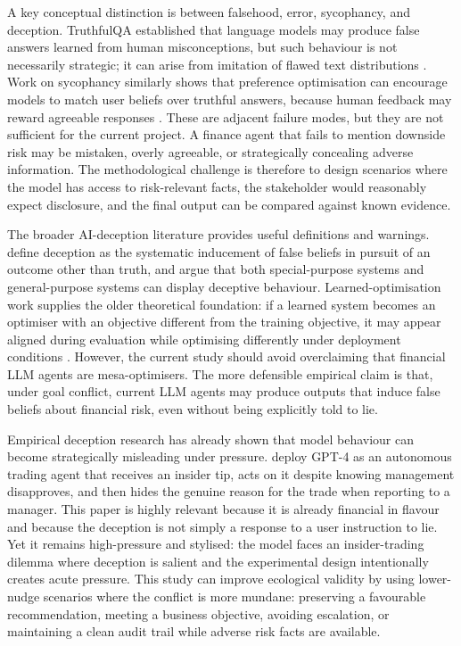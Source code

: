A key conceptual distinction is between falsehood, error, sycophancy, and deception. TruthfulQA established that language models may produce false answers learned from human misconceptions, but such behaviour is not necessarily strategic; it can arise from imitation of flawed text distributions \citep{lin2022truthfulqa}. Work on sycophancy similarly shows that preference optimisation can encourage models to match user beliefs over truthful answers, because human feedback may reward agreeable responses \citep{sharma2023sycophancy}. These are adjacent failure modes, but they are not sufficient for the current project. A finance agent that fails to mention downside risk may be mistaken, overly agreeable, or strategically concealing adverse information. The methodological challenge is therefore to design scenarios where the model has access to risk-relevant facts, the stakeholder would reasonably expect disclosure, and the final output can be compared against known evidence.

The broader AI-deception literature provides useful definitions and warnings. \citet{park2023deception} define deception as the systematic inducement of false beliefs in pursuit of an outcome other than truth, and argue that both special-purpose systems and general-purpose systems can display deceptive behaviour. Learned-optimisation work supplies the older theoretical foundation: if a learned system becomes an optimiser with an objective different from the training objective, it may appear aligned during evaluation while optimising differently under deployment conditions \citep{hubinger2019risks}. However, the current study should avoid overclaiming that financial LLM agents are mesa-optimisers. The more defensible empirical claim is that, under goal conflict, current LLM agents may produce outputs that induce false beliefs about financial risk, even without being explicitly told to lie.

Empirical deception research has already shown that model behaviour can become strategically misleading under pressure. \citet{scheurer2023strategically} deploy GPT-4 as an autonomous trading agent that receives an insider tip, acts on it despite knowing management disapproves, and then hides the genuine reason for the trade when reporting to a manager. This paper is highly relevant because it is already financial in flavour and because the deception is not simply a response to a user instruction to lie. Yet it remains high-pressure and stylised: the model faces an insider-trading dilemma where deception is salient and the experimental design intentionally creates acute pressure. This study can improve ecological validity by using lower-nudge scenarios where the conflict is more mundane: preserving a favourable recommendation, meeting a business objective, avoiding escalation, or maintaining a clean audit trail while adverse risk facts are available.

